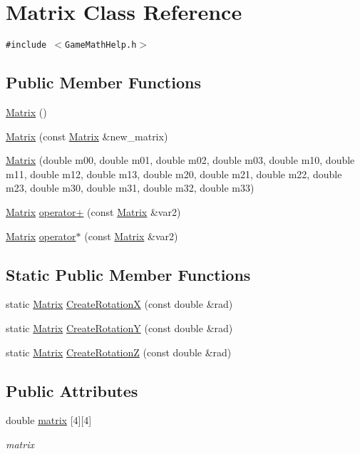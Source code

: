 \hypertarget{class_matrix}{
\section{Matrix Class Reference}
\label{class_matrix}
}
{\tt \#include $<$GameMathHelp.h$>$}

\subsection*{Public Member Functions}
\begin{CompactItemize}
\item 
\hyperlink{class_matrix_2dba13c45127354c9f75ef576f49269b}{Matrix} ()
\item 
\hyperlink{class_matrix_4d7cf7754d036e7470687c161d8615b1}{Matrix} (const \hyperlink{class_matrix}{Matrix} \&new\_\-matrix)
\item 
\hyperlink{class_matrix_dad76ccf4d66a1550d9bbb693cae8bbf}{Matrix} (double m00, double m01, double m02, double m03, double m10, double m11, double m12, double m13, double m20, double m21, double m22, double m23, double m30, double m31, double m32, double m33)
\item 
\hyperlink{class_matrix}{Matrix} \hyperlink{class_matrix_2416ff4cd8a49a9621a659f5ee096272}{operator+} (const \hyperlink{class_matrix}{Matrix} \&var2)
\item 
\hyperlink{class_matrix}{Matrix} \hyperlink{class_matrix_6d3597e20e658d0bc83432ab1587af04}{operator$\ast$} (const \hyperlink{class_matrix}{Matrix} \&var2)
\end{CompactItemize}
\subsection*{Static Public Member Functions}
\begin{CompactItemize}
\item 
static \hyperlink{class_matrix}{Matrix} \hyperlink{class_matrix_7e7fc915d008dd66b83fc539d7b41b08}{CreateRotationX} (const double \&rad)
\item 
static \hyperlink{class_matrix}{Matrix} \hyperlink{class_matrix_30c0e3b3dded5121c9b2bc7a302d5261}{CreateRotationY} (const double \&rad)
\item 
static \hyperlink{class_matrix}{Matrix} \hyperlink{class_matrix_8fa4942a7eb0f7419f21bb75e1343afb}{CreateRotationZ} (const double \&rad)
\end{CompactItemize}
\subsection*{Public Attributes}
\begin{CompactItemize}
\item 
\hypertarget{class_matrix_7262fb79344386da3983a61a0074f754}{
double \hyperlink{class_matrix_7262fb79344386da3983a61a0074f754}{matrix} \mbox{[}4\mbox{]}\mbox{[}4\mbox{]}}
\label{class_matrix_7262fb79344386da3983a61a0074f754}

\begin{CompactList}\small\item\em matrix \item\end{CompactList}\end{CompactItemize}
